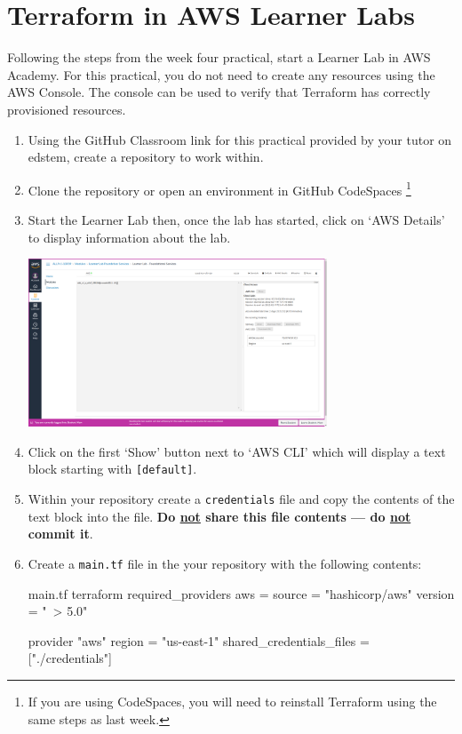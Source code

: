 \documentclass{csse4400}
\begin{document}
\section{Terraform in AWS Learner Labs}
Following the steps from the week four practical,
start a Learner Lab in AWS Academy.
For this practical,
you do not need to create any resources using the AWS Console.
The console can be used to verify that Terraform has correctly provisioned resources.

\begin{enumerate}
\item Using the GitHub Classroom link for this practical provided by your tutor on edstem,
    create a repository to work within.
\item Clone the repository or open an environment in GitHub CodeSpaces%
\footnote{If you are using CodeSpaces, you will need to reinstall Terraform using the same steps as last week.}
\item Start the Learner Lab then, once the lab has started,
    click on `AWS Details' to display information about the lab.

\includegraphics[width=0.7\textwidth]{images/aws-details}

\item Click on the first `Show' button next to `AWS CLI' which will display a text block starting with \texttt{[default]}.
\item Within your repository create a \texttt{credentials} file and copy the contents of the text block into the file.
    \textbf{Do \underline{not} share this file contents --- do \underline{not} commit it}.
\item Create a \texttt{main.tf} file in the your repository with the following contents:
\begin{code}[language=terraform,numbers=none]{main.tf}
terraform {
    required_providers {
        aws = {
            source  = "hashicorp/aws"
            version = "~> 5.0"
        }
    }
}

provider "aws" {
    region = "us-east-1"
    shared_credentials_files = ["./credentials"]
}
\end{code}


\end{enumerate}
\end{document}
